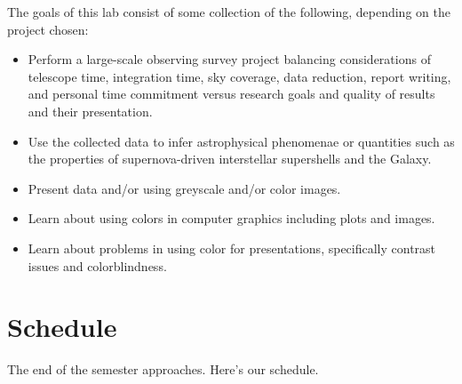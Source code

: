 \documentclass[psfig,preprint]{aastex}
\begin{document}
\noindent
The goals of this lab consist of some collection of the following,
depending on the project chosen:

\begin{itemize}

  \item Perform a large-scale observing survey project balancing
    considerations of telescope time, integration time, sky coverage,
    data reduction, report writing, and personal time commitment versus
    research goals and quality of results and their presentation.

\item Use the collected data to infer astrophysical phenomenae or
  quantities such as the properties of supernova-driven interstellar
  supershells and the Galaxy.

\item Present data and/or using greyscale and/or color images.

\item Learn about using colors in computer graphics including plots and
  images. 

\item Learn about problems in using color for presentations,
  specifically contrast issues and colorblindness.

\end{itemize}


\section{Schedule}

\noindent
The end of the semester approaches. Here's our
schedule.
\end{document}
